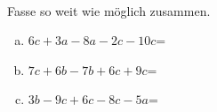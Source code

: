 \begin{aufgabe} ~ \\ 
Fasse so weit wie möglich zusammen.\begin{enumerate}[a)] 
\item 
$6c+3a-8a-2c-10c$=
\item 
$7c+6b-7b+6c+9c$=
\item 
$3b-9c+6c-8c-5a$=
\end{enumerate} 
\end{aufgabe} 
